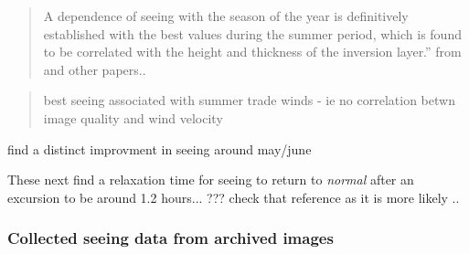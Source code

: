 {{\begin{quote}
A dependence of seeing with the season of the year is definitively established with the best values during the summer period, which is found to be correlated with the height and thickness of the inversion layer.'' from \cite{munoz98homogeneity} and other papers..
\end{quote}

\begin{quote}
best seeing associated with summer trade winds - ie no correlation betwn image quality and wind velocity
\end{quote}

\cite{munoz97nighttime} find a distinct improvment in seeing around may/june


These next find a relaxation time for seeing to return to \emph{normal} after an excursion to be around 1.2 hours...\cite{munoz98homogeneity} ??? check that reference as it is more likely ..\cite{vernin98temporal}




\subsubsection{Collected seeing data from archived images}

}}
